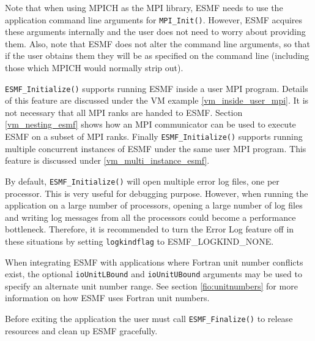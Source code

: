        Note that when using MPICH as the MPI library, ESMF needs to use
       the application command line arguments for {\tt MPI\_Init()}. However,
       ESMF acquires these arguments internally and the user does not need
       to worry about providing them. Also, note that ESMF does not alter
       the command line arguments, so that if the user obtains them they will
       be as specified on the command line (including those which MPICH would
       normally strip out).
  
       {\tt ESMF\_Initialize()} supports running ESMF inside a user MPI program.
       Details of this feature are discussed under the VM example 
       \ref{vm_inside_user_mpi}. It is not necessary that all MPI ranks are
       handed to ESMF. Section \ref{vm_nesting_esmf} shows how an MPI
       communicator can be used to execute ESMF on a subset of MPI ranks.
       Finally {\tt ESMF\_Initialize()} supports running multiple concurrent
       instances of ESMF under the same user MPI program. This feature is
       discussed under \ref{vm_multi_instance_esmf}.
  
       By default, {\tt ESMF\_Initialize()} will open multiple error log files,
       one per processor.  This is very useful for debugging purpose.  However,
       when running the application on a large number of processors, opening a
       large number of log files and writing log messages from all the processors
       could become a performance bottleneck.  Therefore, it is recommended
       to turn the Error Log feature off in these situations by setting
       {\tt logkindflag} to ESMF\_LOGKIND\_NONE.
  
       When integrating ESMF with applications where Fortran unit number conflicts
       exist, the optional {\tt ioUnitLBound} and {\tt ioUnitUBound} arguments may be
       used to specify an alternate unit number range.  See section \ref{fio:unitnumbers}
       for more information on how ESMF uses Fortran unit numbers.
  
       Before exiting the application the user must call {\tt ESMF\_Finalize()}
       to release resources and clean up ESMF gracefully.
  
